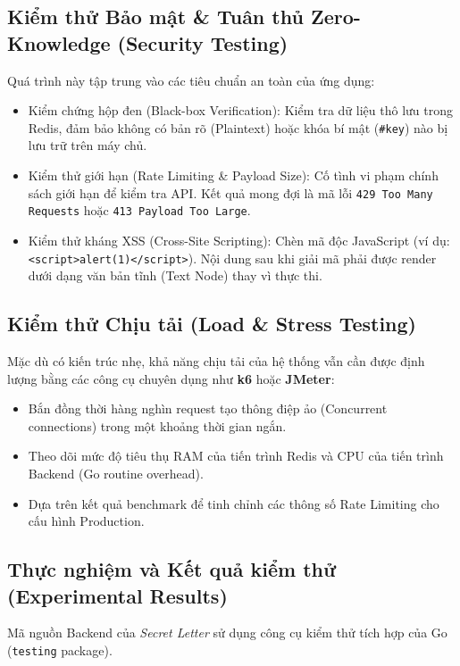 \subsection[Kiểm thử Bảo mật \& Tuân thủ Zero-Knowledge]{Kiểm thử Bảo mật \& Tuân thủ Zero-Knowledge (Security Testing)}

Quá trình này tập trung vào các tiêu chuẩn an toàn của ứng dụng:
\begin{itemize}
    \item Kiểm chứng hộp đen (Black-box Verification): Kiểm tra dữ liệu thô lưu trong Redis, đảm bảo không có bản rõ (Plaintext) hoặc khóa bí mật (\texttt{\#key}) nào bị lưu trữ trên máy chủ.
    \item Kiểm thử giới hạn (Rate Limiting \& Payload Size): Cố tình vi phạm chính sách giới hạn để kiểm tra API. Kết quả mong đợi là mã lỗi \texttt{429 Too Many Requests} hoặc \texttt{413 Payload Too Large}.
    \item Kiểm thử kháng XSS (Cross-Site Scripting): Chèn mã độc JavaScript (ví dụ: \texttt{<script>alert(1)</script>}). Nội dung sau khi giải mã phải được render dưới dạng văn bản tĩnh (Text Node) thay vì thực thi.
\end{itemize}

\subsection{Kiểm thử Chịu tải (Load \& Stress Testing)}

Mặc dù có kiến trúc nhẹ, khả năng chịu tải của hệ thống vẫn cần được định lượng bằng các công cụ chuyên dụng như \textbf{k6} hoặc \textbf{JMeter}:
\begin{itemize}
    \item Bắn đồng thời hàng nghìn request tạo thông điệp ảo (Concurrent connections) trong một khoảng thời gian ngắn.
    \item Theo dõi mức độ tiêu thụ RAM của tiến trình Redis và CPU của tiến trình Backend (Go routine overhead).
    \item Dựa trên kết quả benchmark để tinh chỉnh các thông số Rate Limiting cho cấu hình Production.
\end{itemize}

\subsection{Thực nghiệm và Kết quả kiểm thử (Experimental Results)}

Mã nguồn Backend của \textit{Secret Letter} sử dụng công cụ kiểm thử tích hợp của Go (\texttt{testing} package).


